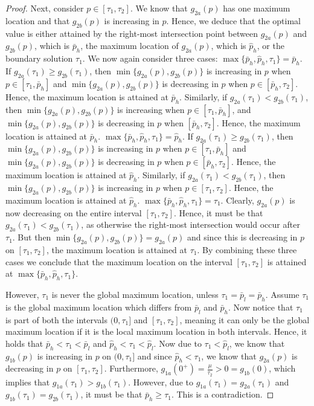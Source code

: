 \documentclass[11pt]{article}
\newcommand{\1}{\mathds{1}}
\begin{document}
\begin{proof}
    Next, consider $p \in [\tau_1,\tau_2]$. We know that $g_{2a}(p)$ has one maximum location and that $g_{2b}(p)$ is increasing in $p$. Hence, we deduce that the optimal value is either attained by the right-most intersection point between $g_{2a}(p)$ and $g_{2b}(p)$, which is $\bar{p}_h$, the maximum location of $g_{2a}(p)$, which is $\hat{p}_h$, or the boundary solution $\tau_1$. We now again consider three cases:  $\max\{\bar{p}_h,\hat{p}_h,\tau_1\} = \bar{p}_h$. If $g_{2a}(\tau_1) \geq g_{2b}(\tau_1)$, then $\min\{g_{2a}(p),g_{2b}(p)\}$ is increasing in $p$ when $p \in [\tau_1,\bar{p}_h]$ and $\min\{g_{2a}(p),g_{2b}(p)\}$ is decreasing in $p$ when $p \in [\bar{p}_h,\tau_2]$. Hence, the maximum location is attained at $\bar{p}_h$. Similarly, if $g_{2a}(\tau_1) < g_{2b}(\tau_1)$, then $\min\{g_{2a}(p),g_{2b}(p)\}$ is increasing when $p \in [\tau_1,\bar{p}_h]$, and $\min\{g_{2a}(p),g_{2b}(p)\}$ is decreasing in $p$ when $[\bar{p}_h,\tau_2]$. Hence, the maximum location is attained at $\bar{p}_h$.  $\max\{\bar{p}_h,\hat{p}_h,\tau_1\} = \hat{p}_h$. If $g_{2a}(\tau_1) \geq g_{2b}(\tau_1)$, then $\min\{g_{2a}(p),g_{2b}(p)\}$ is increasing in $p$ when $p \in [\tau_1,\bar{p}_h]$ and $\min\{g_{2a}(p),g_{2b}(p)\}$ is decreasing in $p$ when $p \in [\bar{p}_h,\tau_2]$. Hence, the maximum location is attained at $\hat{p}_h$. Similarly, if $g_{2a}(\tau_1) < g_{2b}(\tau_1)$, then $\min\{g_{2a}(p),g_{2b}(p)\}$ is increasing in $p$ when $p \in [\tau_1,\tau_2]$. Hence, the maximum location is attained at $\hat{p}_h$.  $\max\{\bar{p}_h,\hat{p}_h,\tau_1\} = \tau_1$. Clearly, $g_{2a}(p)$ is now decreasing on the entire interval $[\tau_1,\tau_2]$. Hence, it must be that $g_{2a}(\tau_1) < g_{2b}(\tau_1)$, as otherwise the right-most intersection would occur after $\tau_1$. But then $\min\{g_{2a}(p),g_{2b}(p)\} = g_{2a}(p)$ and since this is decreasing in $p$ on $[\tau_1,\tau_2]$, the maximum location is attained at $\tau_1$. By combining these three cases we conclude that the maximum location on the interval $[\tau_1,\tau_2]$ is attained at $\max\{\bar{p}_h,\hat{p}_h,\tau_1\}$. 
    
    However, $\tau_1$ is never the global maximum location, unless $\tau_1 = \bar{p}_l = \bar{p}_h$. Assume $\tau_1$ is the global maximum location which differs from $\bar{p}_l$ and $\bar{p}_h$. Now notice that $\tau_1$ is part of both the intervals $(0,\tau_1]$ and $[\tau_1,\tau_2]$, meaning it can only be the global maximum location if it is the local maximum location in both intervals. Hence, it holds that $\bar{p}_h < \tau_1 < \bar{p}_l$ and $\hat{p}_h < \tau_1 < \hat{p}_l$. Now due to $\tau_1 < \hat{p}_l$, we know that $g_{1b}(p)$ is increasing in $p$ on $(0,\tau_1]$ and since $\hat{p}_h < \tau_1$, we know that $g_{2a}(p)$ is decreasing in $p$ on $[\tau_1,\tau_2]$. Furthermore, $g_{1a}(0^+) = \frac{\mu}{\tau_2}>0=g_{1b}(0)$, which implies that $g_{1a}(\tau_1) > g_{1b}(\tau_1)$. However, due to $g_{1a}(\tau_1) = g_{2a}(\tau_1)$ and $g_{1b}(\tau_1) = g_{2b}(\tau_1)$, it must be that $\bar{p}_h \geq \tau_1$. This is a contradiction.
\end{proof}
\end{document}
